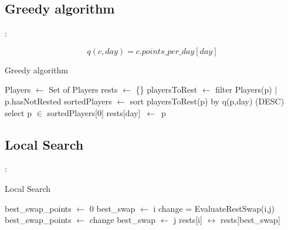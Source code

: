 \documentclass[9pt, aspectratio=169, xcolor=table]{beamer}
\begin{document}
\subsection{Greedy algorithm}
\begin{frame}{\secname: \subsecname}
\begin{tcolorbox}[colback=gray!30, colframe=Veronablue, arc=0pt, outer arc=0pt, title = \textbf{Greedy cost function}]
    \begin{equation*}
      q(c,day)= c.points\_per\_day[day]
    \end{equation*}
\end{tcolorbox}


\begin{algorithm}[H]
	\caption{Greedy algorithm} 
	\begin{algorithmic}[1]
	  \State Players $\leftarrow$ Set of Players
	  \State rests $\leftarrow$ \{\}
	      \State playersToRest $\leftarrow$ filter Players(p) $|$ p.hasNotRested
	    \State sortedPlayers $\leftarrow$ sort playersToRest(p) by q(p,day) (DESC) 
	      \State select p $\in$ sortedPlayers[0]
	      \State rests[day]\ $\leftarrow$\ p
	    \EndFor
	\end{algorithmic} 
\end{algorithm}
\end{frame}

\subsection{Local Search}
\begin{frame}{\secname: \subsecname}
\begin{algorithm}[H]
	\caption{Local Search} 
	\begin{algorithmic}[1]
    \State best\_swap\_points $\leftarrow$ 0
    \State best\_swap $\leftarrow$ i
        \State change = EvaluateRestSwap(i,j)
          \State best\_swap\_points $\leftarrow$ change
          \State best\_swap $\leftarrow$ j
        \EndIf
      \EndFor
      \State rests[i] $\leftrightarrow$ rests[best\_swap]
		\EndFor
	\end{algorithmic} 
\end{algorithm}



\end{frame}
\end{document}
